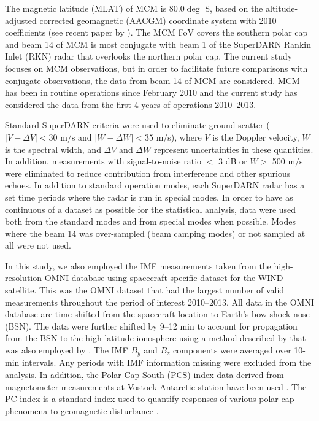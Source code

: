 The magnetic latitude (MLAT) of MCM is 80.0\(\deg\) S, based on the altitude-adjusted corrected geomagnetic (AACGM) coordinate system with 2010 coefficients (see recent paper by \citet{Shepherd2014}). The MCM FoV covers the southern polar cap and beam 14 of MCM is most conjugate with beam 1 of the SuperDARN Rankin Inlet (RKN) radar that overlooks the northern polar cap. The current study focuses on MCM observations, but in order to facilitate future comparisons with conjugate observations, the data from beam 14 of MCM are considered. MCM has been in routine operations since February 2010 and the current study has considered the data from the first 4 years of operations 2010--2013.

Standard SuperDARN criteria were used to eliminate ground scatter (\(\left| V-\Delta V \right| <30\) m/s and \(\left| W-\Delta W \right| <35\) m/s), where \(V\) is the Doppler velocity, \(W\) is the spectral width, and \(\Delta V\) and \(\Delta W\) represent uncertainties in these quantities. In addition, measurements with signal-to-noise ratio \(<\) 3 dB or \(W>\) 500 m/s were eliminated to reduce contribution from interference and other spurious echoes. In addition to standard operation modes, each SuperDARN radar has a set time periods where the radar is run in special modes. In order to have as continuous of a dataset as possible for the statistical analysis, data were used both from the standard modes and from special modes when possible. Modes where the beam 14 was over-sampled (beam camping modes) or not sampled at all were not used.

In this study, we also employed the IMF measurements taken from the high-resolution OMNI database using spacecraft-specific dataset for the WIND satellite. This was the OMNI dataset that had the largest number of valid measurements throughout the period of interest 2010--2013. All data in the OMNI database are time shifted from the spacecraft location to Earth's bow shock nose (BSN). The data were further shifted by 9--12 min to account for propagation from the BSN to the high-latitude ionosphere using a method described by \citet{Khan1999} that was also employed by \citet{Makarevich2012}. The IMF \(B_y\) and \(B_z\) components were averaged over 10-min intervals. Any periods with IMF information missing were excluded from the analysis.  In addition, the Polar Cap South (PCS) index data derived from magnetometer measurements at Vostock Antarctic station have been used \citep{Troshichev1988}.  The PC index is a standard index used to quantify responses of various polar cap phenomena to geomagnetic disturbance \citep[e.g.][]{Fiori2009}.

